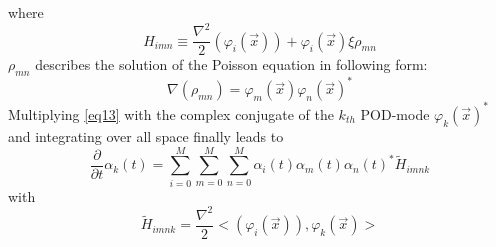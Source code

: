 \documentclass[usenatbib]{mn2e}
\begin{document}
where
\begin{equation}\label{eq14}
H_{imn} \equiv \dfrac {\nabla ^{2}} {2}(\varphi_i(\overrightarrow{x}))+\varphi_i(\overrightarrow{x}) \xi \rho_{mn}
\end{equation}  
\(\rho_{mn}\) describes the solution of the Poisson equation in following form: 
\begin{equation}\label{eq15}
\nabla(\rho_{mn}) = \varphi_m(\overrightarrow{x}) \varphi_n(\overrightarrow{x})^*
\end{equation}
Multiplying \ref{eq13} with the complex conjugate of the \(k_{th}\) POD-mode \(\varphi_{k}(\overrightarrow{x})^*\) and integrating over all space finally leads to
\begin{equation}\label{eq16}
\dfrac {\partial } {\partial t} \alpha_k(t) = \sum_{i=0}^M \sum_{m=0}^M \sum_{n=0}^M \alpha_i(t) \alpha_m(t) \alpha_n(t)^* \widetilde{H}_{imnk}
\end{equation}
with
\begin{equation}\label{eq17}
\widetilde{H}_{imnk} = \dfrac {\nabla ^{2}} {2}<(\varphi_i(\overrightarrow{x})),\varphi_k(\overrightarrow{x})>
\end{equation}




\def\aap{A\&A}
\def\araa{ARA\&A}
\def\apjl{APJL}
\def\mnras{MNRAS}
\def\nat{Nature}
\def\prd{Phys Rev D}


\end{document}

